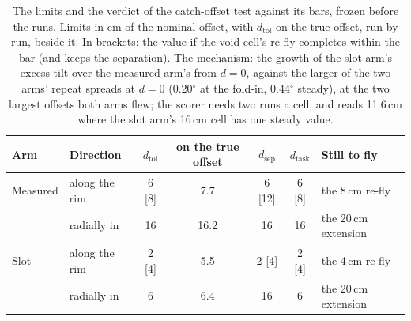 \begin{table}[htbp]
\centering
\footnotesize
\setlength{\tabcolsep}{3pt}
\caption[The catch offset's limits and verdict]{The limits and the verdict of the catch-offset test against its bars,
frozen before the runs. Limits in cm of the nominal offset, with $d_\mathrm{tol}$ on the true offset, run by run, beside
it. In brackets: the value if the void cell's re-fly completes within the bar (and keeps the separation). The
mechanism: the growth of the slot arm's excess tilt over the measured arm's from $d = 0$, against the larger of the two
arms' repeat spreads at $d = 0$ (0.20$^\circ$ at the fold-in, 0.44$^\circ$ steady), at the two largest offsets both arms
flew; the scorer needs two runs a cell, and reads 11.6\,cm where the slot arm's 16\,cm cell has one steady value.}
\label{tab:catch_verdict}
\begin{tabular}{llccccl}
\toprule
Arm & Direction & $d_\mathrm{tol}$ & on the true offset & $d_\mathrm{sep}$ & $d_\mathrm{task}$ & Still to fly \\
\midrule
Measured & along the rim & 6 [8] & 7.7 & 6 [12] & 6 [8] & the 8\,cm re-fly \\
 & radially in & 16 & 16.2 & 16 & 16 & the 20\,cm extension \\
Slot & along the rim & 2 [4] & 5.5 & 2 [4] & 2 [4] & the 4\,cm re-fly \\
 & radially in & 6 & 6.4 & 16 & 6 & the 20\,cm extension \\
\bottomrule
\end{tabular}


\end{table}
